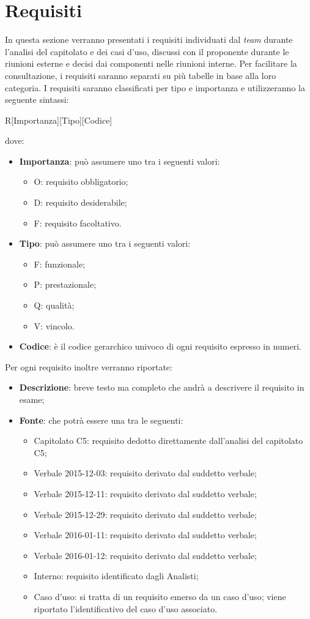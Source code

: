 \newpage
\section{Requisiti}
In questa sezione verranno presentati i requisiti individuati dal \textit{team} durante l'analisi del capitolato e dei casi d'uso, discussi con il proponente durante le riunioni esterne e decisi dai componenti nelle riunioni interne. Per facilitare la consultazione, i
requisiti saranno separati su più tabelle in base alla loro categoria. I requisiti saranno classificati per tipo e importanza e utilizzeranno la seguente sintassi:
\begin{center}
	R[Importanza][Tipo][Codice]
\end{center}
dove:
\begin{itemize}
	\item \textbf{Importanza}: può assumere uno tra i seguenti valori:
	\begin{itemize}
		\item O: requisito obbligatorio;
		\item D: requisito desiderabile;
		\item F: requisito facoltativo.
	\end{itemize}
	\item \textbf{Tipo}: può assumere uno tra i seguenti valori:
	\begin{itemize}
		\item F: funzionale;
		\item P: prestazionale;
		\item Q: qualità;
		\item V: vincolo.
	\end{itemize}
	\item \textbf{Codice}: è il codice gerarchico univoco di ogni requisito espresso in numeri.
\end{itemize} 
Per ogni requisito inoltre verranno riportate:
\begin{itemize}
	\item \textbf{Descrizione}: breve testo ma completo che andrà a descrivere il requisito in esame;
	\item \textbf{Fonte}: che potrà essere una tra le seguenti:
	\begin{itemize}
		\item Capitolato C5: requisito dedotto direttamente dall'analisi del capitolato C5;
		\item Verbale 2015-12-03: requisito derivato dal suddetto verbale;
		\item Verbale 2015-12-11: requisito derivato dal suddetto verbale;
		\item Verbale 2015-12-29: requisito derivato dal suddetto verbale;
		\item Verbale 2016-01-11: requisito derivato dal suddetto verbale;
		\item Verbale 2016-01-12: requisito derivato dal suddetto verbale;
		\item Interno: requisito identificato dagli Analisti;
		\item Caso d’uso: si tratta di un requisito emerso da un caso d’uso; viene riportato l’identificativo del caso d’uso associato.
	\end{itemize} 
\end{itemize}





